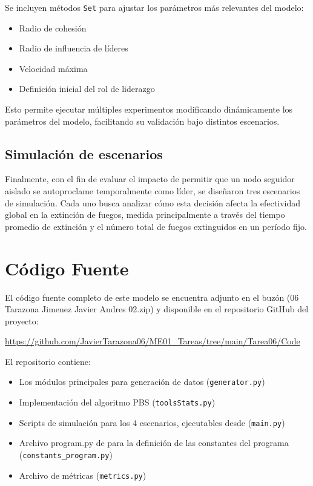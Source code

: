 \documentclass{article}
\begin{document}
Se incluyen métodos \texttt{Set} para ajustar los parámetros más relevantes del modelo:
\begin{itemize}
    \item Radio de cohesión
    \item Radio de influencia de líderes
    \item Velocidad máxima
    \item Definición inicial del rol de liderazgo
\end{itemize}

Esto permite ejecutar múltiples experimentos modificando dinámicamente los parámetros del modelo, facilitando su validación bajo distintos escenarios.

\subsection{Simulación de escenarios}

Finalmente, con el fin de evaluar el impacto de permitir que un nodo seguidor aislado se autoproclame temporalmente como líder, se diseñaron tres escenarios de simulación. Cada uno busca analizar cómo esta decisión afecta la efectividad global en la extinción de fuegos, medida principalmente a través del tiempo promedio de extinción y el número total de fuegos extinguidos en un período fijo.


\section{Código Fuente}\label{sec:cod}

El código fuente completo de este modelo se encuentra adjunto en el buzón 
(06 Tarazona Jimenez Javier Andres 02.zip)
y disponible en el repositorio GitHub del proyecto:

\begin{center}
\url{https://github.com/JavierTarazona06/ME01_Tareas/tree/main/Tarea06/Code}
\end{center}

El repositorio contiene:
\begin{itemize}
\item Los módulos principales para generación de datos (\texttt{generator.py})
\item Implementación del algoritmo PBS (\texttt{toolsStats.py})
\item Scripts de simulación para los 4 escenarios, ejecutables desde (\texttt{main.py})
\item Archivo program.py de para la definición de las constantes del programa 
    (\texttt{constants\_program.py})
\item Archivo de métricas (\texttt{metrics.py})
\end{itemize}
\end{document}
